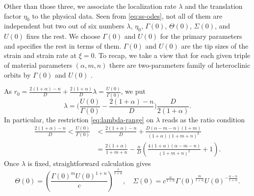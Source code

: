 \documentclass[a4paper,11pt]{article}
\theoremstyle{remark}
\begin{document}
Other than those three, we associate the localization rate $\lambda$  and the translation factor $\eta_0$  to the physical data. Seen from \eqref{eq:ss-odes}, not all of them are independent but two out of six numbers $\lambda$, $\eta_0$, $\Gamma(0)$, $\Theta(0)$, $\Sigma(0)$, and $U(0)$ fixes the rest. We choose $\Gamma(0)$ and $U(0)$ for the primary parameters and specifies the rest in terms of them. $\Gamma(0)$ and $U(0)$ are the tip sizes of the strain and strain rate at $\xi=0$. To recap, we take a view that for each given triple of material parameters $(\alpha,m,n)$ there are two-parameters family of heteroclinic orbits by $\Gamma(0)$ and $U(0)$ .

As $r_0 = \frac{2(1+\alpha)-n}{D} + \frac{2(1+\alpha)}{D}\lambda = \frac{U(0)}{\Gamma(0)}$,
we put
\begin{equation} \label{eq:lambda}
 \lambda = \Big(\frac{U(0)}{\Gamma(0)} - \frac{2(1+\alpha)-n}{D}\Big)\frac{D}{2(1+\alpha)}.
\end{equation}
In particular, the restriction \eqref{eq:lambda-range} on $\lambda$ reads as the ratio condition
\begin{equation} \label{eq:restriction}
\begin{aligned}
 \frac{2(1+\alpha) -n}{D} < \frac{U(0)}{\Gamma(0)} &< \frac{2(1+\alpha) -n}{D} + \frac{D(\alpha-m-n)(1+m)}{(1+\alpha)(1+m+n)^2}\\
 &=\frac{2(1+\alpha)}{1+m+n} -\frac{n}{D}\left( \frac{4(1+\alpha)(\alpha-m-n)}{(1+m+n)^2} +1\right).
\end{aligned}
\end{equation}
Once $\lambda$ is fixed, straightforward calculation gives
$$\Theta(0) = \left(\frac{\Gamma(0)^m U(0)^{1+n}}{c}\right)^{\frac{1}{1+\alpha}}, \quad \Sigma(0) = c^{\frac{\alpha}{1+\alpha}}\Gamma(0)^{\frac{m}{1+\alpha}} U(0)^{-\frac{\alpha-n}{1+\alpha}}.$$
\end{document}
